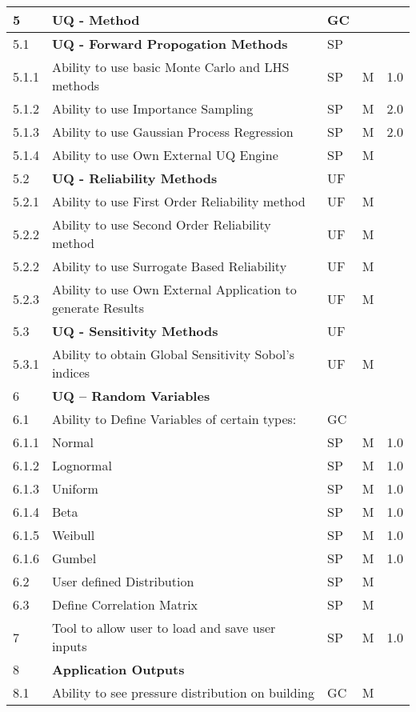 \begin{longtable}{| p{} | p{} | p{} | p{} |  p{} |}
	5 & \textbf{UQ - Method} &  GC &  \\ \hline
	5.1 & \textbf{UQ - Forward Propogation Methods} & SP  &  \\ \hline
	5.1.1 & Ability to use basic  Monte Carlo and LHS methods & SP & M & 1.0 \\ \hline
	5.1.2 & Ability to use Importance Sampling  & SP & M & 2.0 \\ \hline
	5.1.3 & Ability to use Gaussian Process Regression & SP & M & 2.0 \\ \hline
	5.1.4 & Ability to use Own External UQ Engine & SP & M &  \\ \hline
	5.2 & \textbf{UQ - Reliability Methods} & UF &  &  \\ \hline
	5.2.1 & Ability to use First Order Reliability method & UF & M &  \\ \hline
	5.2.2 & Ability to use Second Order Reliability method & UF & M & \\ \hline
	5.2.2 & Ability to use Surrogate Based Reliability & UF & M & \\ \hline
	5.2.3 & Ability to use Own External Application to generate Results & UF & M &  \\ \hline
	5.3 & \textbf{UQ - Sensitivity Methods} & UF &  &  \\ \hline
	5.3.1 & Ability to obtain Global Sensitivity Sobol's indices & UF & M &  \\ \hline
    6 & \textbf{UQ – Random Variables} &  &  \\ \hline
    6.1 & Ability to Define Variables of certain types: & GC &  &  \\ 
    6.1.1 &  Normal & SP & M  & 1.0 \\ \hline
    6.1.2 &  Lognormal & SP & M & 1.0 \\ \hline
    6.1.3 & Uniform & SP & M & 1.0  \\ \hline
    6.1.4 & Beta & SP & M & 1.0 \\ \hline
    6.1.5 & Weibull &  SP & M  & 1.0 \\ \hline
    6.1.6 & Gumbel &  SP & M & 1.0  \\ \hline
    6.2 & User defined Distribution & SP & M &  \\ \hline
    6.3 & Define Correlation Matrix & SP & M &  \\ \hline
     7 & Tool to allow user to load and save user inputs & SP & M & 1.0 \\ \hline
    8 & \textbf{Application Outputs} &  &  \\ \hline
    8.1 & Ability to see pressure distribution on building & GC & M &   \\ \hline

\end{longtable}
